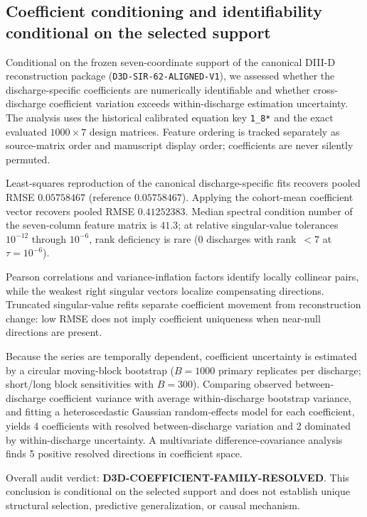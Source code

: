 \subsection{Coefficient conditioning and identifiability conditional on the selected support}
\label{subsec:d3d-coefficient-conditioning}

Conditional on the frozen seven-coordinate support of the canonical
DIII-D reconstruction package (\texttt{D3D-SIR-62-ALIGNED-V1}), we assessed whether the
discharge-specific coefficients are numerically identifiable and whether
cross-discharge coefficient variation exceeds within-discharge estimation
uncertainty. The analysis uses the historical calibrated equation key
\texttt{1\_8*} and the exact evaluated $1000\times 7$ design matrices.
Feature ordering is tracked separately as source-matrix order and manuscript
display order; coefficients are never silently permuted.

Least-squares reproduction of the canonical discharge-specific fits recovers
pooled RMSE $0.05758467$ (reference
$0.05758467$). Applying the cohort-mean coefficient
vector recovers pooled RMSE $0.41252383$.
Median spectral condition number of the seven-column feature matrix is
$41.3$; at relative singular-value tolerances $10^{-12}$ through
$10^{-6}$, rank deficiency is rare
(0 discharges with
rank~$<7$ at $\tau=10^{-6}$).

Pearson correlations and variance-inflation factors identify locally collinear
pairs, while the weakest right singular vectors localize compensating
directions. Truncated singular-value refits separate coefficient movement from
reconstruction change: low RMSE does not imply coefficient uniqueness when
near-null directions are present.

Because the series are temporally dependent, coefficient uncertainty is
estimated by a circular moving-block bootstrap ($B=1000$
primary replicates per discharge; short/long block sensitivities with
$B=300$). Comparing observed
between-discharge coefficient variance with average within-discharge bootstrap
variance, and fitting a heteroscedastic Gaussian random-effects model for each
coefficient, yields
4 coefficients with resolved
between-discharge variation and
2 dominated by within-discharge
uncertainty. A multivariate difference-covariance analysis finds
5 positive resolved directions in
coefficient space.

Overall audit verdict: \textbf{D3D-COEFFICIENT-FAMILY-RESOLVED}.
This conclusion is conditional on the selected support and does not establish
unique structural selection, predictive generalization, or causal mechanism.
